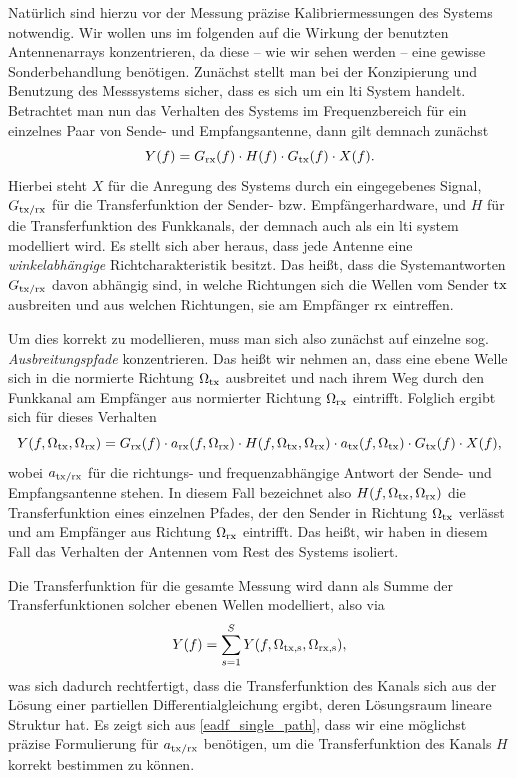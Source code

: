 Nat\"urlich sind hierzu vor der Messung pr\"azise Kalibriermessungen des Systems notwendig. Wir wollen uns im folgenden auf die Wirkung der benutzten Antennenarrays konzentrieren, da diese -- wie wir sehen werden -- eine gewisse Sonderbehandlung ben\"otigen. Zun\"achst stellt man bei der Konzipierung und Benutzung des Messsystems sicher, dass es sich um ein \gls{lti} System handelt. Betrachtet man nun das Verhalten des Systems im Frequenzbereich f\"ur ein einzelnes Paar von Sende- und Empfangsantenne, dann gilt demnach zun\"achst
\begin{equation}
    Y(f) = G_{\rm rx}(f) \cdot H(f) \cdot G_{\rm tx}(f) \cdot X(f).
\end{equation}
Hierbei steht $X$ f\"ur die Anregung des Systems durch ein eingegebenes Signal, $G_{\rm tx/\rm rx}$ f\"ur die Transferfunktion der Sender- bzw. Empf\"angerhardware, und $H$ f\"ur die Transferfunktion des Funkkanals, der demnach auch als ein \gls{lti} system modelliert wird. Es stellt sich aber heraus, dass jede Antenne eine \emph{winkelabh\"angige} Richtcharakteristik besitzt. Das hei{\ss}t, dass die Systemantworten $G_{\rm tx/\rm rx}$ davon abh\"angig sind, in welche Richtungen sich die Wellen vom Sender $\rm tx$ ausbreiten und aus welchen Richtungen, sie am Empf\"anger $\rm rx$ eintreffen. 

Um dies korrekt zu modellieren, muss man sich also zun\"achst auf einzelne sog. \emph{Ausbreitungspfade} konzentrieren. Das hei{\ss}t wir nehmen an, dass eine ebene Welle sich in die normierte Richtung $\Omega_{\rm tx}$ ausbreitet und nach ihrem Weg durch den Funkkanal am Empf\"anger aus normierter Richtung $\Omega_{\rm rx}$ eintrifft. Folglich ergibt sich f\"ur dieses Verhalten
\begin{equation}\label{eadf_single_path}
    Y(f, \Omega_{\rm tx}, \Omega_{\rm rx}) = 
        G_{\rm rx}(f) \cdot a_{\rm rx}(f, \Omega_{\rm rx})
        \cdot H(f, \Omega_{\rm tx}, \Omega_{\rm rx}) 
        \cdot a_{\rm tx}(f, \Omega_{\rm tx}) \cdot G_{\rm tx}(f)
        \cdot X(f),
\end{equation}
%
wobei $a_{\rm tx/\rm rx}$ f\"ur die richtungs- und frequenzabh\"angige Antwort der Sende- und Empfangsantenne stehen. In diesem Fall bezeichnet also $H(f, \Omega_{\rm tx}, \Omega_{\rm rx})$ die Transferfunktion eines einzelnen Pfades, der den Sender in Richtung $\Omega_{\rm tx}$ verl\"asst und am Empf\"anger aus Richtung $\Omega_{\rm rx}$ eintrifft. Das hei{\ss}t, wir haben in diesem Fall das Verhalten der Antennen vom Rest des Systems isoliert. 

Die Transferfunktion f\"ur die gesamte Messung wird dann als Summe der Transferfunktionen solcher ebenen Wellen modelliert, also via
\begin{equation}
    Y(f) = {\sum\limits_{s = 1}^{S}{
        Y(f, \Omega_{\rm tx,s}, \Omega_{\rm rx,s})
    }},
\end{equation}
was sich dadurch rechtfertigt, dass die Transferfunktion des Kanals sich aus der L\"osung einer partiellen Differentialgleichung ergibt, deren L\"osungsraum lineare Struktur hat.
Es zeigt sich aus \eqref{eadf_single_path}, dass wir eine m\"oglichst pr\"azise Formulierung f\"ur $a_{\rm tx/\rm rx}$ ben\"otigen, um die Transferfunktion des Kanals $H$ korrekt bestimmen zu k\"onnen.
%
%
%
